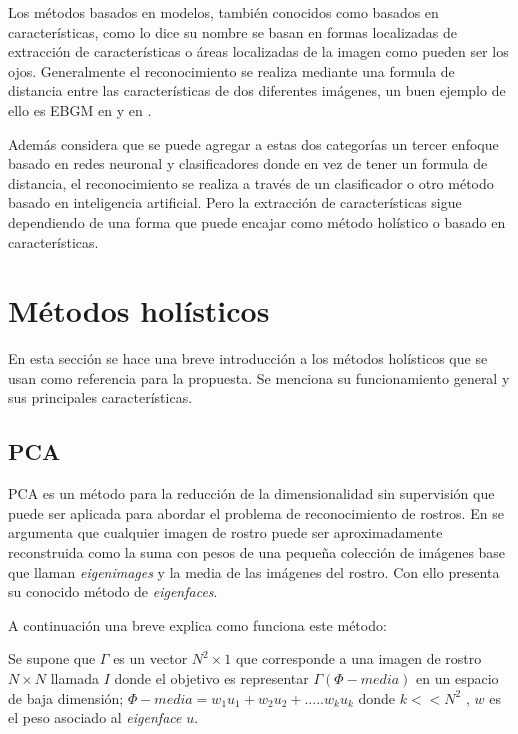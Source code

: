 Los métodos basados en modelos, también conocidos como basados en características, como lo dice su nombre se basan en formas localizadas de extracción de características o áreas localizadas de la imagen como pueden ser los ojos.
Generalmente el reconocimiento se realiza mediante una formula de distancia entre las características de dos diferentes imágenes, un buen ejemplo de ello es \ac{EBGM} en \cite{wiskott1997face} y en \cite{bolme2003elastic}.

Además \cite{zhao2003face} considera que se puede agregar a estas dos categorías un tercer enfoque basado en redes neuronal y clasificadores donde en vez de tener un formula de distancia, el reconocimiento se realiza a través de un clasificador o otro método basado en inteligencia artificial. Pero la extracción de características sigue dependiendo de una forma que puede encajar como método holístico o basado en características.

\section{Métodos holísticos}
En esta sección se hace una breve introducción a los métodos holísticos que se usan como referencia para la propuesta. Se menciona su funcionamiento general y sus principales características.


\subsection{\acf{PCA}}
\ac{PCA} es un método para la reducción de la dimensionalidad sin supervisión que puede ser aplicada para abordar el problema de reconocimiento de rostros. En \cite{sirovich1987low} se argumenta que cualquier imagen de rostro puede ser aproximadamente reconstruida como la suma con pesos de una pequeña colección de imágenes base que llaman \textit{eigenimages} y la media de las imágenes del rostro. Con ello \cite{turk1991eigenfaces} presenta su conocido método de \textit{eigenfaces}.

A continuación una breve explica como funciona este método:

Se supone que $\Gamma$ es un vector $N^2\times 1$ que corresponde a una imagen de rostro $N\times N$ llamada $I$ donde el objetivo es representar $\Gamma (\Phi-media)$ en un espacio de baja dimensión; $\Phi- media=w_1u_1+w_2u_2+.....w_ku_k$ donde $k<<N^2$ , $w$ es el peso asociado al \textit{eigenface} $u$.

